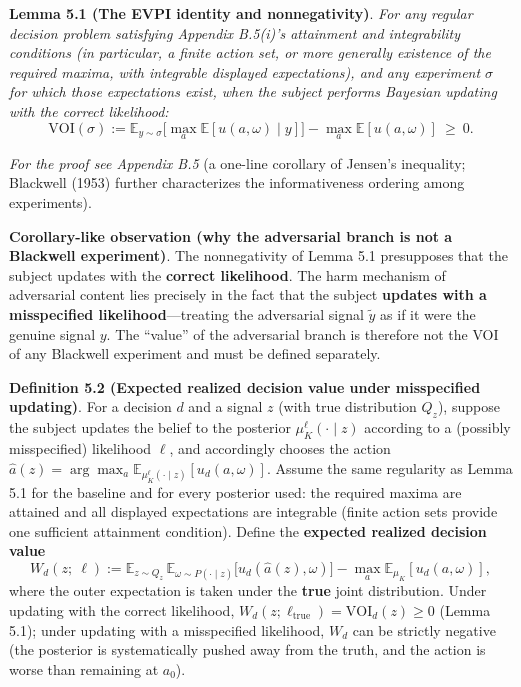 \documentclass[
  11pt]{article}
\begin{document}
\textbf{Lemma 5.1 (The EVPI identity and nonnegativity)}. \emph{For any
regular decision problem satisfying Appendix B.5(i)'s attainment and
integrability conditions (in particular, a finite action set, or more
generally existence of the required maxima, with integrable displayed
expectations), and any experiment \(\sigma\) for which those
expectations exist, when the subject performs Bayesian updating with the
correct likelihood:}
\[\mathrm{VOI}(\sigma) := \mathbb{E}_{y \sim \sigma}\Big[\max_a \mathbb{E}[u(a,\omega) \mid y]\Big] - \max_a \mathbb{E}[u(a,\omega)] \ \ge\ 0.\]

\emph{For the proof see Appendix B.5} (a one-line corollary of Jensen's
inequality; Blackwell (1953) further characterizes the informativeness
ordering among experiments).

\textbf{Corollary-like observation (why the adversarial branch is not a
Blackwell experiment)}. The nonnegativity of Lemma 5.1 presupposes that
the subject updates with the \textbf{correct likelihood}. The harm
mechanism of adversarial content lies precisely in the fact that the
subject \textbf{updates with a misspecified likelihood}---treating the
adversarial signal \(\tilde y\) as if it were the genuine signal \(y\).
The ``value'' of the adversarial branch is therefore not the VOI of any
Blackwell experiment and must be defined separately.

\textbf{Definition 5.2 (Expected realized decision value under
misspecified updating)}. For a decision \(d\) and a signal \(z\) (with
true distribution \(Q_z\)), suppose the subject updates the belief to
the posterior \(\mu_K^{\ell}(\cdot \mid z)\) according to a (possibly
misspecified) likelihood \(\ell\), and accordingly chooses the action
\(\hat a(z) = \arg\max_a \mathbb{E}_{\mu_K^{\ell}(\cdot\mid z)}[u_d(a,\omega)]\).
Assume the same regularity as Lemma 5.1 for the baseline and for every
posterior used: the required maxima are attained and all displayed
expectations are integrable (finite action sets provide one sufficient
attainment condition). Define the \textbf{expected realized decision
value}
\[W_d(z;\ \ell) := \mathbb{E}_{z \sim Q_z}\,\mathbb{E}_{\omega \sim P(\cdot \mid z)}\big[u_d(\hat a(z), \omega)\big] - \max_a \mathbb{E}_{\mu_K}[u_d(a,\omega)],\]
where the outer expectation is taken under the \textbf{true} joint
distribution. Under updating with the correct likelihood,
\(W_d(z;\ell_{\mathrm{true}}) = \mathrm{VOI}_d(z) \ge 0\) (Lemma 5.1);
under updating with a misspecified likelihood, \(W_d\) can be strictly
negative (the posterior is systematically pushed away from the truth,
and the action is worse than remaining at \(a_0\)).
\end{document}
